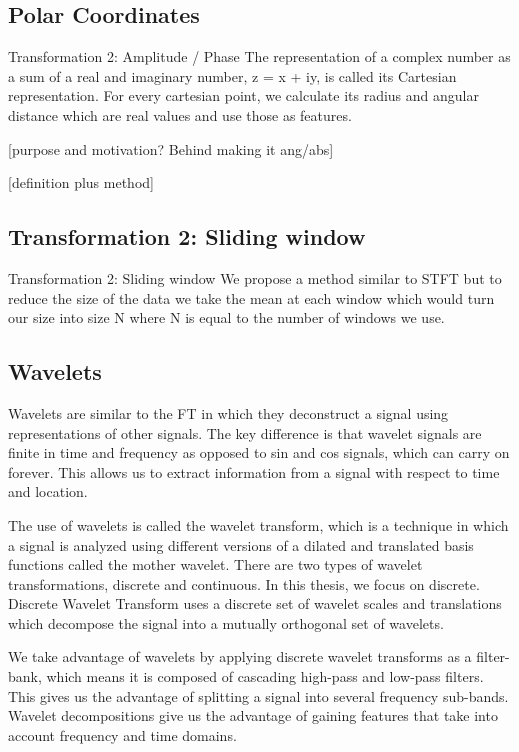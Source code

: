\documentclass{turabian-thesis}
\begin{document}
\subsection{Polar Coordinates}

Transformation 2: Amplitude / Phase
The representation of a complex number as a sum of a real and imaginary number, z = x + iy, is called its Cartesian representation. For every cartesian point, we calculate its radius and angular distance which are real values and use those as features.

[purpose and motivation? Behind making it ang/abs]

[definition plus method]



\subsection{Transformation 2: Sliding window }

Transformation 2: Sliding window 
We propose a method similar to STFT but to reduce the size of the data we take the mean at each window which would turn our size into size N where N is equal to the number of windows we use.

\subsection{Wavelets}


Wavelets are similar to the FT in which they deconstruct a signal using representations of other signals. The key difference is that wavelet signals are finite in time and frequency as opposed to sin and cos signals, which can carry on forever. This allows us to extract information from a signal with respect to time and location.

The use of wavelets is called the wavelet transform, which is a technique in which a signal is analyzed using different versions of a dilated and translated basis functions called the mother wavelet. There are two types of wavelet transformations, discrete and continuous. In this thesis, we focus on discrete. Discrete Wavelet Transform uses a discrete set of wavelet scales and translations which decompose the signal into a mutually orthogonal set of wavelets. 

We take advantage of wavelets by applying discrete wavelet transforms as a filter-bank, which means it is composed of cascading high-pass and low-pass filters. This gives us the advantage of splitting a signal into several frequency sub-bands. Wavelet decompositions give us the advantage of gaining features that take into account frequency and time domains. 
\end{document}

